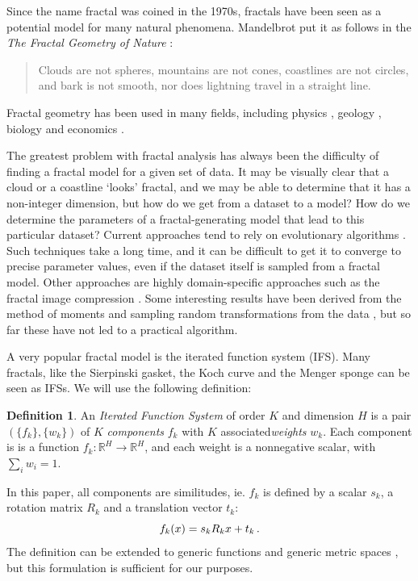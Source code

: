 \documentclass[10pt,a4paper,oneside]{article}
\theoremstyle{definition}
\newcommand{\p}{\mbox{\,.}}
\newcommand{\R}{\mathbb{R}}
\theoremstyle{definition}
\newtheorem{definition}{Definition}
\begin{document}
Since the name fractal was coined in the 1970s, fractals have been seen as a potential model for many natural phenomena. Mandelbrot put it as follows in the \emph{The Fractal Geometry of Nature} \cite{mandelbrot1982fractal}:

\begin{quotation}
\small
\noindent Clouds are not spheres, mountains are not cones, coastlines are not circles, and bark is not smooth, nor does lightning travel in a straight line.
\end{quotation}

Fractal geometry has been used in many fields, including physics \cite{mandelbrot1984fractals}, geology \cite{cheng1997multifractal}, biology \cite{goldberger1992fractal} and economics \cite{turiel2003multifractal}.

The greatest problem with fractal analysis has always been the difficulty of finding a fractal model for a given set of data. It may be visually clear that a cloud or a coastline `looks' fractal, and we may be able to determine that it has a non-integer dimension, but how do we get from a dataset to a model? How do we determine the parameters of a fractal-generating model that lead to this particular dataset? Current approaches tend to rely on evolutionary algorithms \cite{deliu1991genetic}. Such techniques take a long time, and it can be difficult to get it to converge to precise parameter values, even if the dataset itself is sampled from a fractal model.
Other approaches are highly domain-specific approaches such as the fractal image compression \cite{hart1996fractal}. Some interesting results have been derived from the method of moments \cite{rinaldo1994inverse} and sampling random transformations from the data \cite{hart1997similarity}, but so far these have not led to a practical algorithm. 


A very popular fractal model is the iterated function system (IFS). Many fractals, like the Sierpinski gasket, the Koch curve and the Menger sponge can be seen as IFSs. We will use the following definition:
\begin{definition}
An \emph{Iterated Function System} of order $K$ and dimension $H$ is a pair $(\{f_k\}, \{w_k\})$ of $K$ \emph{components} $f_k$ with $K$ associated\emph{weights} $w_k$. Each component is is a function $f_k: \R^H \to \R^H$, and each weight is a nonnegative scalar, with $\sum_i w_i = 1$. 
\end{definition}
In this paper, all components are similitudes, ie. $f_k$ is defined by a scalar $s_k$, a rotation matrix $R_k$ and a translation vector $t_k$:
\[
f_k(x) = s_kR_k x + t_k \p
\]
The definition can be extended to generic functions and generic metric spaces \cite{hutchinson2000deterministic}, but this formulation is sufficient for our purposes. 
\end{document}

